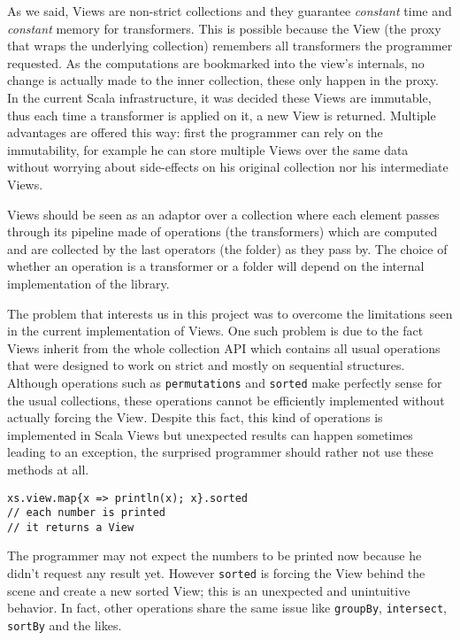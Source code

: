 \documentclass[a4paper,12pt,twocolumn]{article}
\begin{document}
As we said, Views are non-strict collections and they guarantee {\it constant}\/ time and {\it constant}\/ memory for transformers.
This is possible because the View (the proxy that wraps the underlying collection) remembers all transformers the programmer requested.
As the computations are bookmarked into the view's internals, no change is actually made to the inner collection, these only happen in the proxy.
In the current Scala infrastructure, it was decided these Views are immutable, thus each time a transformer is applied on it, a new View is returned.
Multiple advantages are offered this way: first the programmer can rely on the immutability, for example he can store multiple Views over the same data without worrying about side-effects on his original collection nor his intermediate Views.

Views should be seen as an adaptor over a collection where each element passes through its pipeline made of operations (the transformers) which are computed and are collected by the last operators (the folder) as they pass by.
The choice of whether an operation is a transformer or a folder will depend on the internal implementation of the library.

The problem that interests us in this project was to overcome the limitations seen in the current implementation of Views.
One such problem is due to the fact Views inherit from the whole collection API which contains all usual operations that were designed to work on strict and mostly on sequential structures.
Although operations such as \verb|permutations| and \verb|sorted| make perfectly sense for the usual collections, these operations cannot be efficiently implemented without actually forcing the View. %
Despite this fact, this kind of operations is implemented in Scala Views but unexpected results can happen sometimes leading to an exception, the surprised programmer should rather not use these methods at all. %

\begin{lstlisting}
xs.view.map{x => println(x); x}.sorted
// each number is printed
// it returns a View
\end{lstlisting}

The programmer may not expect the numbers to be printed now because he didn't request any result yet.
However \verb|sorted| is forcing the View behind the scene and create a new sorted View; this is an unexpected and unintuitive behavior.
In fact, other operations share the same issue like \verb|groupBy|, \verb|intersect|, \verb|sortBy| and the likes.
\end{document}
